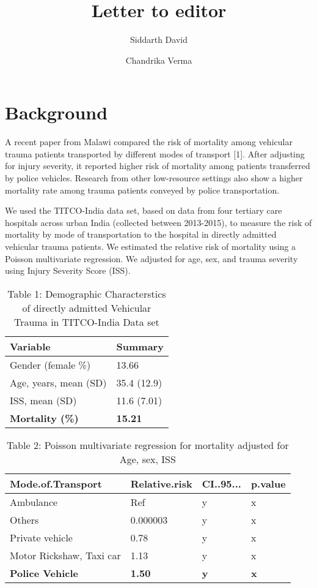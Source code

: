 \documentclass[
]{article}
\title{Letter to editor}
\author{Siddarth David \and Chandrika Verma}
\date{}
\begin{document}
\maketitle

\hypertarget{background}{%
\section{Background}\label{background}}

A recent paper from Malawi compared the risk of mortality among
vehicular trauma patients transported by different modes of transport
{[}1{]}. After adjusting for injury severity, it reported higher risk of
mortality among patients transferred by police vehicles. Research from
other low-resource settings also show a higher mortality rate among
trauma patients conveyed by police transportation.

We used the TITCO-India data set, based on data from four tertiary care
hospitals across urban India (collected between 2013-2015), to measure
the risk of mortality by mode of transportation to the hospital in
directly admitted vehicular trauma patients. We estimated the relative
risk of mortality using a Poisson multivariate regression. We adjusted
for age, sex, and trauma severity using Injury Severity Score (ISS).

\begin{table}

\caption{\label{tab:unnamed-chunk-2}Table 1: Demographic Characterstics of directly admitted Vehicular Trauma in TITCO-India Data set}
\centering
\begin{tabular}[t]{l|l}
\hline
Variable & Summary\\
\hline
Gender (female \%) & 13.66\\
\hline
Age, years, mean (SD) & 35.4 (12.9)\\
\hline
ISS, mean (SD) & 11.6 (7.01)\\
\hline
\textbf{Mortality (\%)} & \textbf{15.21}\\
\hline
\end{tabular}
\end{table}

\begin{table}

\caption{\label{tab:unnamed-chunk-2}Table 2: Poisson multivariate regression for mortality adjusted for Age, sex, ISS}
\centering
\begin{tabular}[t]{l|l|l|l}
\hline
Mode.of.Transport & Relative.risk & CI..95... & p.value\\
\hline
Ambulance & Ref & y & x\\
\hline
Others & 0.000003 & y & x\\
\hline
Private vehicle & 0.78 & y & x\\
\hline
Motor Rickshaw, Taxi car & 1.13 & y & x\\
\hline
\textbf{Police Vehicle} & \textbf{1.50} & \textbf{y} & \textbf{x}\\
\hline
\end{tabular}
\end{table}
\end{document}
